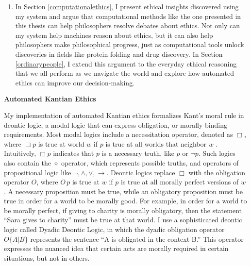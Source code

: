 \begin{isabellebody}
\begin{isamarkuptext}
\begin{enumerate}
\item In Section \ref{computationalethics}, I present ethical insights discovered using my system and argue that
computational methods like the one presented in this thesis can help philosophers resolve debates about ethics.
Not only can my system help machines reason about ethics, but it can also help philosophers make philosophical
progress, just as computational tools unlock discoveries in fields like protein folding and drug discovery.
In Section \ref{ordinarypeople}, I extend this argument to the everyday ethical reasoning that we all
perform as we navigate the world and explore how automated ethics can improve our decision-making. 
\end{enumerate}%
\end{isamarkuptext}\isamarkuptrue%
%
\begin{isamarkuptext}%
\noindent \textbf{Automated Kantian Ethics}

\medskip 

My implementation of automated Kantian ethics formalizes Kant's moral rule
in deontic logic, a modal logic that can express obligation, or morally binding requirements. Most modal 
logics include a necessitation operator, denoted as $\Box$, where
$\Box p$ is true at world $w$ if $p$ is true at all worlds that neighbor $w$ \citep{cresswell}. Intuitively, 
$\Box p$ indicates that $p$ is a necessary truth, like $p$ or $\neg p$. Such 
logics also contain the $\diamond$ operator, which represents possible truths, and operators of 
propositional logic like $\neg, \wedge, \vee, \rightarrow$. Deontic logics
replace $\Box$ with the obligation operator $O$, where $O \, p$ is true at $w$ 
if $p$ is true at all morally perfect versions of $w$ \citep{sep-logic-deontic}. A necessary 
proposition must be true, while an obligatory proposition must be true in order for a world to be morally good.
For example, in order for a world to be morally perfect, if giving to charity is morally obligatory, then
the statement ``Sara gives to charity'' must be true at that world. I use a sophisticated deontic logic 
called Dyadic Deontic Logic, in which the dyadic obligation operator $O\{A \vert B\}$ represents the 
sentence ``A is obligated in the context B.'' This operator expresses the nuanced idea
that certain acts are morally required in certain situations, but not in others.


\end{isamarkuptext}
\end{isabellebody}
